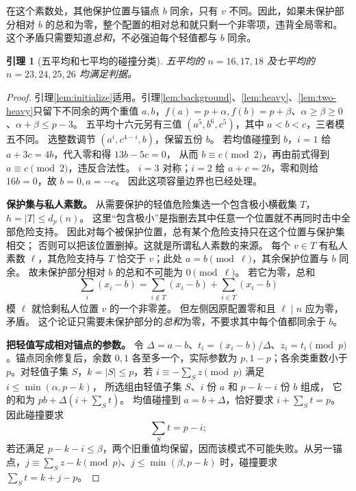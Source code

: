 \documentclass[11pt,a4paper,oneside,openany]{book}
\newtheorem{lemma}[theorem]{引理}
\theoremstyle{definition}
\numberwithin{equation}{chapter}
\begin{document}
在这个素数处，其他保护位置与锚点 $b$ 同余，只有 $v$ 不同。因此，如果未保护部分相对 $b$ 的总和为零，整个配置的相对总和就只剩一个非零项，违背全局零和。这个矛盾只需要知道\emph{总和}，不必强迫每个轻值都与 $b$ 同余。
\begin{lemma}[五平均和七平均的碰撞分类]\label{lem:collision-small}
五平均的 $n=16,17,18$ 及七平均的 $n=23,24,25,26$ 均满足判据。
\end{lemma}
\begin{proof}
引理\ref{lem:initialize}适用。引理\ref{lem:background}、\ref{lem:heavy}、\ref{lem:two-heavy}只留下不同余的两个重值 $a,b$，$f(a)=p+\alpha,f(b)=p+\beta$、$\alpha\ge\beta\ge0$、$\alpha+\beta\le p-3$。
五平均十六元另有三值 $(a^5,b^6,c^5)$，其中 $a<b<c$，三者模五不同。
选整数调节 $(a^i,c^{4-i},b)$，保留五份 $b$。
若均值碰撞到 $b$，$i=1$ 给 $a+3c=4b$，代入零和得 $13b-5c=0$，
从而 $b\equiv c\pmod2$，再由前式得到 $a\equiv c\pmod2$，违反合法性。
$i=3$ 对称；$i=2$ 给 $a+c=2b$，零和则给 $16b=0$，故 $b=0,a=-c$。
因此这项容量边界也已经处理。

\par\noindent\textbf{保护集与私人素数。}
从需要保护的轻值危险集选一个包含极小横截集 $T$，$h=|T|\le d_p(n)$。
这里“包含极小”是指删去其中任意一个位置就不再同时击中全部危险支持。
因此对每个被保护位置，总有某个危险支持只在这个位置与保护集相交；
否则可以把该位置删掉。这就是所谓私人素数的来源。
每个 $v\in T$ 有私人素数 $\ell$，其危险支持与 $T$ 恰交于 $v$；此处 $a=b\pmod\ell$，其余保护位置与 $b$ 同余。
故未保护部分相对 $b$ 的总和不可能为 $0\pmod\ell$。
若它为零，总和
\[
\sum_i(x_i-b)=\sum_{i\notin T}(x_i-b)+\sum_{i\in T}(x_i-b)
\]
模 $\ell$ 就恰剩私人位置 $v$ 的一个非零差。
但左侧因原配置零和且 $\ell\mid n$ 应为零，矛盾。
这个论证只需要未保护部分的\emph{总和}为零，不要求其中每个值都同余于 $b$。

\par\noindent\textbf{把轻值写成相对锚点的参数。}
令 $\Delta=a-b$、$t_i=(x_i-b)/\Delta$、$z_i=t_i\pmod p$。锚点同余修复后，余数 $0,1$ 各至多一个，实际参数为 $p,1-p$；各余类重数小于 $p$。对轻值子集 $S$，$k=|S|\le p$，若 $i\equiv-\sum_{S}z\pmod p$ 满足 $i\le\min(\alpha,p-k)$，
所选组由轻值子集 $S$、$i$ 份 $a$ 和 $p-k-i$ 份 $b$ 组成，
它的和为 $pb+\Delta(i+\sum_S t)$。
均值碰撞到 $a=b+\Delta$，恰好要求 $i+\sum_S t=p$。
因此碰撞要求
\begin{equation}\label{eq:collision}
\sum_{S}t=p-i;
\end{equation}
若还满足 $p-k-i\le\beta$，两个旧重值均保留，因而该模式不可能失败。从另一锚点，$j\equiv\sum_S z-k\pmod p$、$j\le\min(\beta,p-k)$ 时，碰撞要求 $\sum_S t=k+j-p$。


\end{proof}
\end{document}
